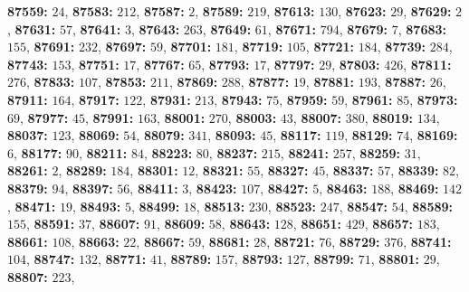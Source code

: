 \textsf{\bfseries 87559:} $24$, \textsf{\bfseries 87583:} $212$, \textsf{\bfseries 87587:} $2$, \textsf{\bfseries 87589:} $219$, \textsf{\bfseries 87613:} $130$, \textsf{\bfseries 87623:} $29$, \textsf{\bfseries 87629:} $2$, \textsf{\bfseries 87631:} $57$, \textsf{\bfseries 87641:} $3$, \textsf{\bfseries 87643:} $263$, \textsf{\bfseries 87649:} $61$, \textsf{\bfseries 87671:} $794$, \textsf{\bfseries 87679:} $7$, \textsf{\bfseries 87683:} $155$, \textsf{\bfseries 87691:} $232$, \textsf{\bfseries 87697:} $59$, \textsf{\bfseries 87701:} $181$, \textsf{\bfseries 87719:} $105$, \textsf{\bfseries 87721:} $184$, \textsf{\bfseries 87739:} $284$, \textsf{\bfseries 87743:} $153$, \textsf{\bfseries 87751:} $17$, \textsf{\bfseries 87767:} $65$, \textsf{\bfseries 87793:} $17$, \textsf{\bfseries 87797:} $29$, \textsf{\bfseries 87803:} $426$, \textsf{\bfseries 87811:} $276$, \textsf{\bfseries 87833:} $107$, \textsf{\bfseries 87853:} $211$, \textsf{\bfseries 87869:} $288$, \textsf{\bfseries 87877:} $19$, \textsf{\bfseries 87881:} $193$, \textsf{\bfseries 87887:} $26$, \textsf{\bfseries 87911:} $164$, \textsf{\bfseries 87917:} $122$, \textsf{\bfseries 87931:} $213$, \textsf{\bfseries 87943:} $75$, \textsf{\bfseries 87959:} $59$, \textsf{\bfseries 87961:} $85$, \textsf{\bfseries 87973:} $69$, \textsf{\bfseries 87977:} $45$, \textsf{\bfseries 87991:} $163$, \textsf{\bfseries 88001:} $270$, \textsf{\bfseries 88003:} $43$, \textsf{\bfseries 88007:} $380$, \textsf{\bfseries 88019:} $134$, \textsf{\bfseries 88037:} $123$, \textsf{\bfseries 88069:} $54$, \textsf{\bfseries 88079:} $341$, \textsf{\bfseries 88093:} $45$, \textsf{\bfseries 88117:} $119$, \textsf{\bfseries 88129:} $74$, \textsf{\bfseries 88169:} $6$, \textsf{\bfseries 88177:} $90$, \textsf{\bfseries 88211:} $84$, \textsf{\bfseries 88223:} $80$, \textsf{\bfseries 88237:} $215$, \textsf{\bfseries 88241:} $257$, \textsf{\bfseries 88259:} $31$, \textsf{\bfseries 88261:} $2$, \textsf{\bfseries 88289:} $184$, \textsf{\bfseries 88301:} $12$, \textsf{\bfseries 88321:} $55$, \textsf{\bfseries 88327:} $45$, \textsf{\bfseries 88337:} $57$, \textsf{\bfseries 88339:} $82$, \textsf{\bfseries 88379:} $94$, \textsf{\bfseries 88397:} $56$, \textsf{\bfseries 88411:} $3$, \textsf{\bfseries 88423:} $107$, \textsf{\bfseries 88427:} $5$, \textsf{\bfseries 88463:} $188$, \textsf{\bfseries 88469:} $142$, \textsf{\bfseries 88471:} $19$, \textsf{\bfseries 88493:} $5$, \textsf{\bfseries 88499:} $18$, \textsf{\bfseries 88513:} $230$, \textsf{\bfseries 88523:} $247$, \textsf{\bfseries 88547:} $54$, \textsf{\bfseries 88589:} $155$, \textsf{\bfseries 88591:} $37$, \textsf{\bfseries 88607:} $91$, \textsf{\bfseries 88609:} $58$, \textsf{\bfseries 88643:} $128$, \textsf{\bfseries 88651:} $429$, \textsf{\bfseries 88657:} $183$, \textsf{\bfseries 88661:} $108$, \textsf{\bfseries 88663:} $22$, \textsf{\bfseries 88667:} $59$, \textsf{\bfseries 88681:} $28$, \textsf{\bfseries 88721:} $76$, \textsf{\bfseries 88729:} $376$, \textsf{\bfseries 88741:} $104$, \textsf{\bfseries 88747:} $132$, \textsf{\bfseries 88771:} $41$, \textsf{\bfseries 88789:} $157$, \textsf{\bfseries 88793:} $127$, \textsf{\bfseries 88799:} $71$, \textsf{\bfseries 88801:} $29$, \textsf{\bfseries 88807:} $223$, 
